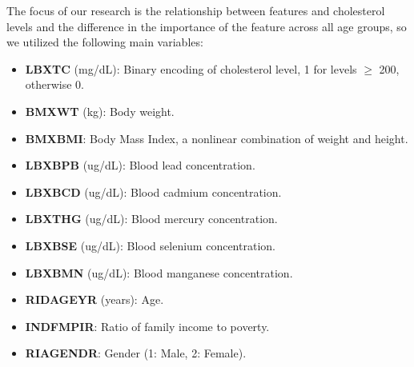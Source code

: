 \documentclass{article}
\begin{document}
The focus of our research is the relationship between features and cholesterol levels and the difference in the importance of the feature across all age groups, so we utilized the following main variables:

\begin{itemize}
    \item \textbf{LBXTC} (mg/dL): Binary encoding of cholesterol level, 1 for levels $\geq$ 200, otherwise 0.
    \item \textbf{BMXWT} (kg): Body weight.
    \item \textbf{BMXBMI}: Body Mass Index, a nonlinear combination of weight and height.
    \item \textbf{LBXBPB} (ug/dL): Blood lead concentration.
    \item \textbf{LBXBCD} (ug/dL): Blood cadmium concentration.
    \item \textbf{LBXTHG} (ug/dL): Blood mercury concentration.
    \item \textbf{LBXBSE} (ug/dL): Blood selenium concentration.
    \item \textbf{LBXBMN} (ug/dL): Blood manganese concentration.
    \item \textbf{RIDAGEYR} (years): Age.
    \item \textbf{INDFMPIR}: Ratio of family income to poverty.
    \item \textbf{RIAGENDR}: Gender (1: Male, 2: Female).
\end{itemize}
\end{document}
